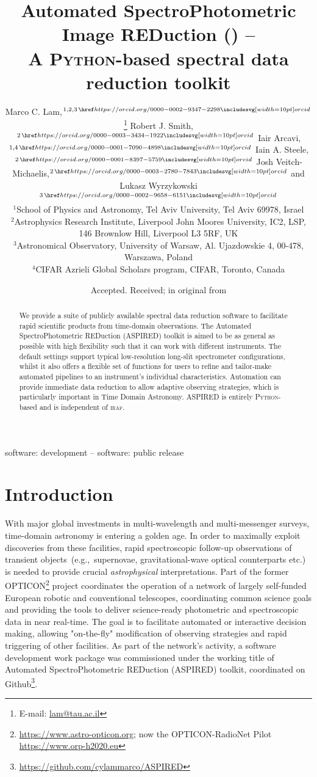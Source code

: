 \documentclass[fleqn,usenatbib]{mnras}
\title[ASPIRED]{Automated SpectroPhotometric Image REDuction (\ASPIRED) -- \\ A \textsc{Python}-based spectral data reduction toolkit\\
}
\author[M. C. Lam et al.]
{Marco C. Lam,$^{1, 2, 3\,\orcid{0000-0002-9347-2298}}$\thanks{E-mail: \href{mailto:lam@tau.ac.il}{lam@tau.ac.il}}
Robert J. Smith,$^{2\,\orcid{0000-0003-3434-1922}}$
Iair Arcavi,$^{1, 4\,\orcid{0000-0001-7090-4898}}$
Iain A. Steele,$^{2\,\orcid{0000-0001-8397-5759}}$
\newauthor Josh Veitch-Michaelis,$^{2\,\orcid{0000-0003-2780-7843}}$ and
Lukasz Wyrzykowski$^{3\,\orcid{0000-0002-9658-6151}}$\\
$^{1}$School of Physics and Astronomy, Tel Aviv University, Tel Aviv 69978, Israel\\
$^{2}$Astrophysics Research Institute, Liverpool John Moores University, IC2, LSP, 146 Brownlow Hill, Liverpool L3 5RF, UK\\
$^{3}$Astronomical Observatory, University of Warsaw, Al. Ujazdowskie 4, 00-478, Warszawa, Poland\\
$^{4}$CIFAR Azrieli Global Scholars program, CIFAR, Toronto, Canada
}
\date{Accepted. Received; in original from}
\begin{document}
\label{firstpage}
\pagerange{\pageref{firstpage}--\pageref{lastpage}}
\maketitle

\begin{abstract}
We provide a suite of publicly available spectral data reduction software to facilitate
rapid scientific products from time-domain observations. The Automated SpectroPhotometric
REDuction (\textsc{ASPIRED}) toolkit is aimed to be as general as possible with high flexibility
such that it can work with different instruments. The default settings support typical
low-resolution long-slit spectrometer configurations, whilst it also offers a flexible set of
functions for users to refine and tailor-make automated pipelines to an instrument's
individual characteristics. Automation can provide immediate data reduction to allow adaptive
observing strategies, which is particularly important in Time Domain Astronomy. \textsc{ASPIRED} is
entirely \textsc{Python}-based and is independent of \textsc{iraf}.
\end{abstract}

\begin{keywords}
software: development -- software: public release
\end{keywords}



\section{Introduction}
With major global investments in multi-wavelength and multi-messenger surveys, time-domain
astronomy is entering a golden age. In order to maximally exploit discoveries from these
facilities, rapid spectroscopic follow-up observations of transient objects~(e.g.,\ supernovae,
gravitational-wave optical counterparts etc.) is needed to provide crucial {\em astrophysical} 
interpretations. Part of the former OPTICON\footnote{\url{https://www.astro-opticon.org}; now the
OPTICON-RadioNet Pilot \url{https://www.orp-h2020.eu}} project coordinates the operation of a
network of largely self-funded European robotic and conventional telescopes, coordinating
common science goals and providing the tools to deliver science-ready photometric and
spectroscopic data in near real-time. The goal is to facilitate automated or interactive
decision making, allowing "on-the-fly" modification of observing strategies and rapid
triggering of other facilities. As part of the network's activity, a software development work package was
commissioned under the working title of Automated SpectroPhotometric REDuction (\textsc{ASPIRED})
toolkit, coordinated on Github\footnote{\url{https://github.com/cylammarco/ASPIRED}}.
\end{document}
